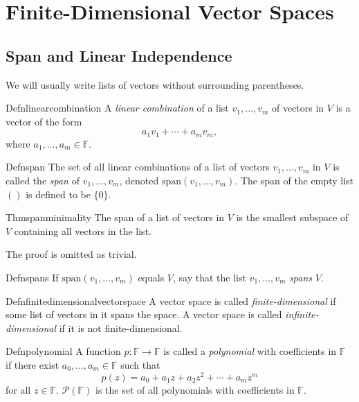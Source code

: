\chapter{Finite-Dimensional Vector Spaces}

\section{Span and Linear Independence}

We will usually write lists of vectors without surrounding parentheses.

\begin{reference}{Defn}{linearcombination}
  A \textit{linear combination} of a list $v_1,\dots,v_m$ of vectors in $V$ is a vector of the form
  \[
    a_1v_1+\cdots+a_mv_m,
  \]
  where $a_1,\dots,a_m\in \mathbb F$.
\end{reference}

\begin{reference}{Defn}{span}
  The set of all linear combinations of a list of vectors $v_1,\dots,v_m$ in $V$ is called the \textit{span} of $v_1,\dots,v_m$, denoted $\mathrm{span}(v_1,\dots,v_m)$. The span of the empty list $()$ is defined to be $\{0\}$.
\end{reference}

\begin{reference}{Thm}{spanminimality}
  The span of a list of vectors in $V$ is the smallest subspace of $V$ containing all vectors in the list.
\end{reference}

The proof is omitted as trivial.

\begin{reference}{Defn}{spans}
  If $\mathrm{span}(v_1,\dots,v_m)$ equals $V$, say that the list $v_1,\dots,v_m$ \textit{spans} $V$.
\end{reference}

\begin{reference}{Defn}{finitedimensionalvectorspace}
  A vector space is called \textit{finite-dimensional} if some list of vectors in it spans the space.
  A vector space is called \textit{infinite-dimensional} if it is not finite-dimensional.
\end{reference}

\begin{reference}{Defn}{polynomial}
  A function \( p : \mathbb{F} \to \mathbb{F} \) is called a \textit{polynomial} with coefficients in \( \mathbb{F} \) if there exist \( a_0, \ldots, a_m \in \mathbb{F} \) such that
  \[
    p(z) = a_0 + a_1 z + a_2 z^2 + \cdots + a_m z^m
  \]
  for all \( z \in \mathbb{F} \). \(\mathcal P(\mathbb{F})\) is the set of all polynomials with coefficients in \( \mathbb{F} \).
\end{reference}

